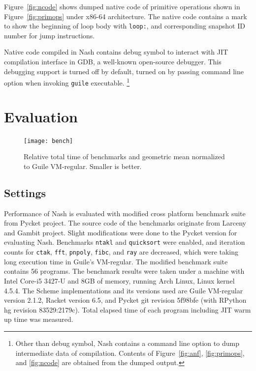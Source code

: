 \documentclass[preprint, 10pt]{sigplanconf}
\begin{document}
Figure~\hyperref[fig:ncode]{\ref{fig:ncode}} shows dumped native code of
primitive operations shown in Figure~\hyperref[fig:primops]{\ref{fig:primops}}
under x86-64 architecture. The native code contains a mark to show the beginning
of loop body with \texttt{loop:}, and corresponding snapshot ID number for jump
instructions.

Native code compiled in Nash contains debug symbol to interact with JIT
compilation interface in GDB, a well-known open-source debugger. This debugging
support is turned off by default, turned on by passing command line option when
invoking \texttt{guile} executable.
\footnote{Other than debug symbol, Nash contains a command line option to dump
  intermediate data of compilation. Contents of
  Figure~\hyperref[fig:anf]{\ref{fig:anf}},
  \hyperref[fig:primops]{\ref{fig:primops}}, and
  \hyperref[fig:ncode]{\ref{fig:ncode}} are obtained from the dumped output.}

\section{Evaluation}
\label{sec:evaluation}

\begin{figure}
  \centering
  \texttt{[image: bench]}
  \caption{Relative total time of benchmarks and geometric mean normalized to
    Guile VM-regular. Smaller is better.}
\label{fig:bench}
\end{figure}

\subsection{Settings}

Performance of Nash is evaluated with modified cross platform benchmark suite
from Pycket project. The source code of the benchmarks originate from Larceny
and Gambit project. Slight modifications were done to the Pycket version for
evaluating Nash. Benchmarks \texttt{ntakl} and \texttt{quicksort} were enabled,
and iteration counts for \texttt{ctak}, \texttt{fft}, \texttt{pnpoly},
\texttt{fibc}, and \texttt{ray} are decreased, which were taking long execution
time in Guile's VM-regular. The modified benchmark suite contains 56
programs. The benchmark results were taken under a machine with Intel Core-i5
3427-U and 8GB of memory, running Arch Linux, Linux kernel 4.5.4. The Scheme
implementations and its versions used are Guile VM-regular version 2.1.2, Racket
version 6.5, and Pycket git revision 5f98bfe (with RPython hg revision
83529:2179c). Total elapsed time of each program including JIT warm up time was
measured.
\end{document}
